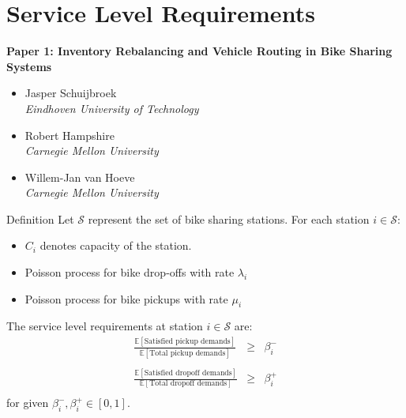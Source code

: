 
\section{Service Level Requirements}

	\begin{frame}
	\textbf{Paper 1: Inventory Rebalancing and Vehicle Routing in Bike Sharing Systems}
	\begin{itemize}
		\item Jasper Schuijbroek \\
		\textit{Eindhoven University of Technology}
		\item Robert Hampshire \\
		\textit{Carnegie Mellon University}
		\item Willem-Jan van Hoeve \\
		\textit{Carnegie Mellon University}
	\end{itemize}
	\end{frame}

    \begin{frame}{Definition}
    Let $\mathcal{S}$ represent the set of bike sharing stations. For each station $i \in \mathcal{S}$:
    \begin{itemize}
        \item $C_i$ denotes capacity of the station.
        \item Poisson process for bike drop-offs with rate $\lambda_i$
        \item Poisson process for bike pickups  with rate $\mu_i$
    \end{itemize}
    \pause
    The service level requirements at station $i \in \mathcal{S}$ are:
    \begin{eqnarray*}
        \frac{\mathbb{E}[\textrm{Satisfied pickup demands}]}{\mathbb{E}[\textrm{Total pickup demands}]} &\geq& \beta_{i}^{-} \\ \\
        \frac{\mathbb{E}[\textrm{Satisfied dropoff demands}]}{\mathbb{E}[\textrm{Total dropoff demands}]} &\geq& \beta_{i}^{+} \\
    \end{eqnarray*}
    for given $\beta_{i}^{-},\beta_{i}^{+} \in [0,1]$.
    \end{frame}

